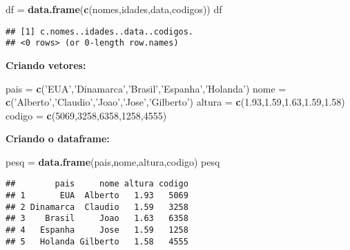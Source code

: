 \documentclass[]{article}
\newenvironment{Shaded}{\begin{snugshade}}{\end{snugshade}}
\newcommand{\KeywordTok}[1]{\textcolor[rgb]{0.13,0.29,0.53}{\textbf{#1}}}
\newcommand{\DecValTok}[1]{\textcolor[rgb]{0.00,0.00,0.81}{#1}}
\newcommand{\FloatTok}[1]{\textcolor[rgb]{0.00,0.00,0.81}{#1}}
\newcommand{\StringTok}[1]{\textcolor[rgb]{0.31,0.60,0.02}{#1}}
\newcommand{\NormalTok}[1]{#1}
\begin{document}
\begin{Shaded}
\begin{Highlighting}[]
\NormalTok{df =}\StringTok{ }\KeywordTok{data.frame}\NormalTok{(}\KeywordTok{c}\NormalTok{(nomes,idades,data,codigos))}
\NormalTok{df}
\end{Highlighting}
\end{Shaded}

\begin{verbatim}
## [1] c.nomes..idades..data..codigos.
## <0 rows> (or 0-length row.names)
\end{verbatim}

\textbf{Criando vetores:}

\begin{Shaded}
\begin{Highlighting}[]
\NormalTok{pais =}\StringTok{ }\KeywordTok{c}\NormalTok{(}\StringTok{'EUA'}\NormalTok{,}\StringTok{'Dinamarca'}\NormalTok{,}\StringTok{'Brasil'}\NormalTok{,}\StringTok{'Espanha'}\NormalTok{,}\StringTok{'Holanda'}\NormalTok{)}
\NormalTok{nome =}\StringTok{ }\KeywordTok{c}\NormalTok{(}\StringTok{'Alberto'}\NormalTok{,}\StringTok{'Claudio'}\NormalTok{,}\StringTok{'Joao'}\NormalTok{,}\StringTok{'Jose'}\NormalTok{,}\StringTok{'Gilberto'}\NormalTok{)}
\NormalTok{altura =}\StringTok{ }\KeywordTok{c}\NormalTok{(}\FloatTok{1.93}\NormalTok{,}\FloatTok{1.59}\NormalTok{,}\FloatTok{1.63}\NormalTok{,}\FloatTok{1.59}\NormalTok{,}\FloatTok{1.58}\NormalTok{)}
\NormalTok{codigo =}\StringTok{ }\KeywordTok{c}\NormalTok{(}\DecValTok{5069}\NormalTok{,}\DecValTok{3258}\NormalTok{,}\DecValTok{6358}\NormalTok{,}\DecValTok{1258}\NormalTok{,}\DecValTok{4555}\NormalTok{)}
\end{Highlighting}
\end{Shaded}

\textbf{Criando o dataframe:}

\begin{Shaded}
\begin{Highlighting}[]
\NormalTok{pesq =}\StringTok{ }\KeywordTok{data.frame}\NormalTok{(pais,nome,altura,codigo)}
\NormalTok{pesq}
\end{Highlighting}
\end{Shaded}

\begin{verbatim}
##        pais     nome altura codigo
## 1       EUA  Alberto   1.93   5069
## 2 Dinamarca  Claudio   1.59   3258
## 3    Brasil     Joao   1.63   6358
## 4   Espanha     Jose   1.59   1258
## 5   Holanda Gilberto   1.58   4555
\end{verbatim}
\end{document}

